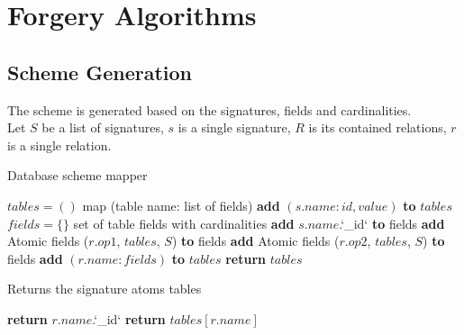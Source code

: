\documentclass[oneside]{book}
\begin{document}
\newpage

\section{Forgery Algorithms}
\label{sec:algorithm}

\subsection{Scheme Generation}

The scheme is generated based on the signatures, fields and cardinalities.\\

Let $S$ be a list of signatures, $s$ is a single signature, $R$ is its contained relations, $r$ is a single relation.\\

\begin{algorithm}
\caption{Database scheme mapper}
\label{array-sum0}
\begin{algorithmic}[1]
	\State $tables = ()$ \Comment map (table name: list of fields)
		\State \textbf{add} $(s.name: {id, value})$ \textbf{to} $tables$
			\State $fields = \{\}$ \Comment set of table fields with cardinalities
			\State \textbf{add} $s.name$.`\_id` \textbf{to} fields
			\State \textbf{add} Atomic fields ($r.op1$, $tables$, $S$) \textbf{to} fields
				\State \textbf{add} Atomic fields ($r.op2$, $tables$, $S$) \textbf{to} fields
			\EndIf
			\State \textbf{add} $(r.name: fields)$ \textbf{to} $tables$
		\EndFor
	\EndFor
	\State \textbf{return} $tables$
\EndFunction
\end{algorithmic}
\end{algorithm}

\begin{algorithm}
\caption{Returns the signature atoms tables}
\label{array-sum1}
\begin{algorithmic}[1]
				\State \textbf{return} $r.name$.`\_id`
			\EndIf
			\State \textbf{return} $tables[r.name]$
\EndFunction
\end{algorithmic}
\end{algorithm}
\end{document}
